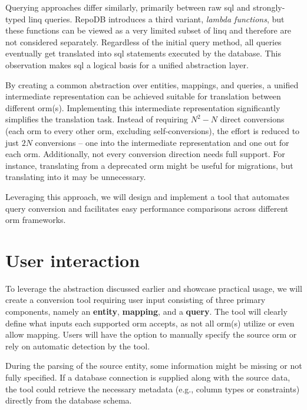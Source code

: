 Querying approaches differ similarly, primarily between raw \acrshort{sql} and strongly-typed \acrshort{linq} queries. RepoDB introduces a third variant, \textit{lambda functions}, but these functions can be viewed as a very limited subset of \acrshort{linq} and therefore are not considered separately. Regardless of the initial query method, all queries eventually get translated into \acrshort{sql} statements executed by the database. This observation makes \acrshort{sql} a logical basis for a unified abstraction layer.

By creating a common abstraction over entities, mappings, and queries, a unified intermediate representation can be achieved suitable for translation between different \acrshort{orm}(s). Implementing this intermediate representation significantly simplifies the translation task. Instead of requiring $N^2 - N$ direct conversions (each \acrshort{orm} to every other \acrshort{orm}, excluding self-conversions), the effort is reduced to just $2N$ conversions -- one into the intermediate representation and one out for each \acrshort{orm}. Additionally, not every conversion direction needs full support. For instance, translating from a deprecated \acrshort{orm} might be useful for migrations, but translating into it may be unnecessary.

Leveraging this approach, we will design and implement a tool that automates query conversion and facilitates easy performance comparisons across different \acrshort{orm} frameworks.

\section{User interaction}
To leverage the abstraction discussed earlier and showcase practical usage, we will create a conversion tool requiring user input consisting of three primary components, namely an \textbf{entity}, \textbf{mapping}, and a \textbf{query}. The tool will clearly define what inputs each supported \acrshort{orm} accepts, as not all \acrshort{orm}(s) utilize or even allow mapping. Users will have the option to manually specify the source \acrshort{orm} or rely on automatic detection by the tool.

During the parsing of the source entity, some information might be missing or not fully specified. If a database connection is supplied along with the source data, the tool could retrieve the necessary metadata (e.g., column types or constraints) directly from the database schema.

